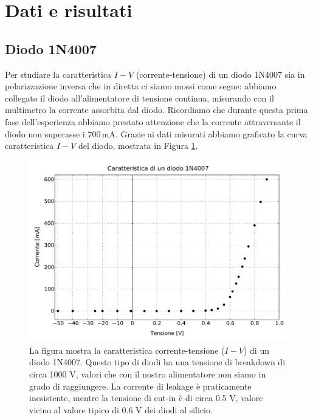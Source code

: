 \section*{Dati e risultati}

\subsection{Diodo 1N4007}

Per studiare la caratteristica $I-V$ (corrente-tensione) di un diodo 1N4007 sia in polarizzazione inversa che in diretta ci siamo mossi come segue: abbiamo collegato il diodo all'alimentatore di tensione continua, misurando con il multimetro la corrente assorbita dal diodo.
Ricordiamo che durante questa prima fase dell'esperienza abbiamo prestato attenzione che la corrente attraversante il diodo non superasse i $700\,\si{\milli\ampere}$.
Grazie ai dati misurati abbiamo graficato la curva caratteristica $I-V$ del diodo, mostrata in Figura \ref{fig:diodo}.

\begin{figure}
    \includegraphics[scale=0.50]{diodo.pdf}
    \caption{La figura mostra la caratteristica corrente-tensione ($I-V$) di un diodo 1N4007. Questo tipo di diodi ha una tensione di breakdown di circa 1000 V, valori che con il nostro alimentatore non siamo in grado di raggiungere.
    La corrente di leakage è praticamente inesistente, mentre la tensione di cut-in è di circa 0.5 V, valore vicino al valore tipico di 0.6 V dei diodi al silicio. }
    \label{fig:diodo}
\end{figure}

